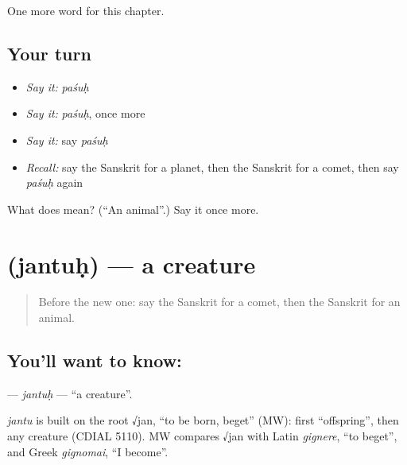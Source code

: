 \begin{grammarlens}[title={What you've built}]
One more word for this chapter.
\end{grammarlens}

\subsection*{Your turn}
\begin{itemize}
\raggedright
  \item \emph{Say it:} \emph{paśuḥ}
  \item \emph{Say it:} \emph{paśuḥ}, once more
  \item \emph{Say it:} say \emph{paśuḥ}
  \item \emph{Recall:} say the Sanskrit for a planet, then the Sanskrit for a comet, then say \emph{paśuḥ} again
\end{itemize}

\begin{tcolorbox}[breakable,colback=teal!4,colframe=teal!35!black,title={Before you move on}]
What does  mean? (\textquotedblleft{}An animal\textquotedblright{}.) Say it once more.
\end{tcolorbox}
\section[\texorpdfstring{\sk{जन्तुः} (jantuḥ)}{जन्तुः (jantuḥ)}]{ (jantuḥ) — a creature}

\label{lesson:SA-C226-jantuh}



\begin{quote}
Before the new one: say the Sanskrit for a comet, then the Sanskrit for an animal.
\end{quote}

\subsection*{You'll want to know: }
\textbf{} — \emph{jantuḥ} — \textquotedblleft{}a creature\textquotedblright{}.

\begin{cousinweb}
\emph{jantu} is built on the root √jan, \textquotedblleft{}to be born, beget\textquotedblright{} (MW): first \textquotedblleft{}offspring\textquotedblright{}, then any creature (CDIAL 5110). MW compares √jan with Latin \emph{gignere}, \textquotedblleft{}to beget\textquotedblright{}, and Greek \emph{gignomai}, \textquotedblleft{}I become\textquotedblright{}.
\end{cousinweb}

